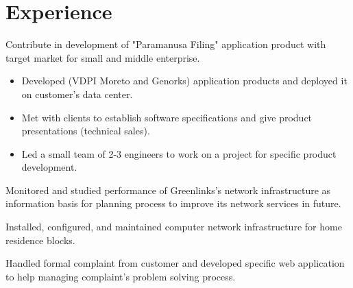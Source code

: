 \documentclass[10pt, a4paper]{moderncv}
\begin{document}
\section{Experience}
{
    \begin{scriptsize}
        Contribute in development of "Paramanusa Filing" application product with target market for small and middle enterprise.
    \end{scriptsize}
}
{
    \begin{itemize}
        \item Developed (VDPI Moreto and Genorks) application products and deployed it on customer's data center.
        \item Met with clients to establish software specifications and give product presentations (technical sales).
        \item Led a small team of 2-3 engineers to work on a project for specific product development.
    \end{itemize}
}
{
    \begin{scriptsize}
        Monitored and studied performance of Greenlinks's network infrastructure as information basis for planning process to improve its network services in future.
    \end{scriptsize}
}
{
    \begin{scriptsize}
        Installed, configured, and maintained computer network infrastructure for home residence blocks.
    \end{scriptsize}
}
{
    \begin{scriptsize}
        Handled formal complaint from customer and developed specific web application to help managing complaint's problem solving process.
    \end{scriptsize}
}
\end{document}
